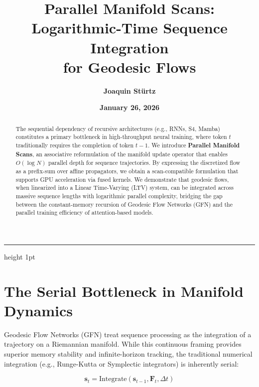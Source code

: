 \documentclass[12pt,a4paper]{article}
\title{\textbf{Parallel Manifold Scans: Logarithmic-Time Sequence Integration\\ for Geodesic Flows}}
\author{\textbf{Joaquin Stürtz}}
\date{\textbf{January 26, 2026}}
\newcommand{\bs}{\mathbf{s}}
\begin{document}
\maketitle
\vspace{-0.5cm}
\begin{center}
\hrule height 1pt
\end{center}
\vspace{0.5cm}

\begin{abstract}
The sequential dependency of recursive architectures (e.g., RNNs, S4, Mamba) constitutes a primary bottleneck in high-throughput neural training, where token $t$ traditionally requires the completion of token $t-1$. We introduce \textbf{Parallel Manifold Scans}, an associative reformulation of the manifold update operator that enables $O(\log N)$ parallel depth for sequence trajectories. By expressing the discretized flow as a prefix-sum over affine propagators, we obtain a scan-compatible formulation that supports GPU acceleration via fused kernels. We demonstrate that geodesic flows, when linearized into a Linear Time-Varying (LTV) system, can be integrated across massive sequence lengths with logarithmic parallel complexity, bridging the gap between the constant-memory recursion of Geodesic Flow Networks (GFN) and the parallel training efficiency of attention-based models.
\end{abstract}

\vspace{1cm}

\section{The Serial Bottleneck in Manifold Dynamics}

Geodesic Flow Networks (GFN) treat sequence processing as the integration of a trajectory on a Riemannian manifold. While this continuous framing provides superior memory stability and infinite-horizon tracking, the traditional numerical integration (e.g., Runge-Kutta or Symplectic integrators) is inherently serial:

\begin{equation}
\bs_{t} = \text{Integrate}(\bs_{t-1}, \mathbf{F}_t, \Delta t)
\end{equation}
\end{document}
